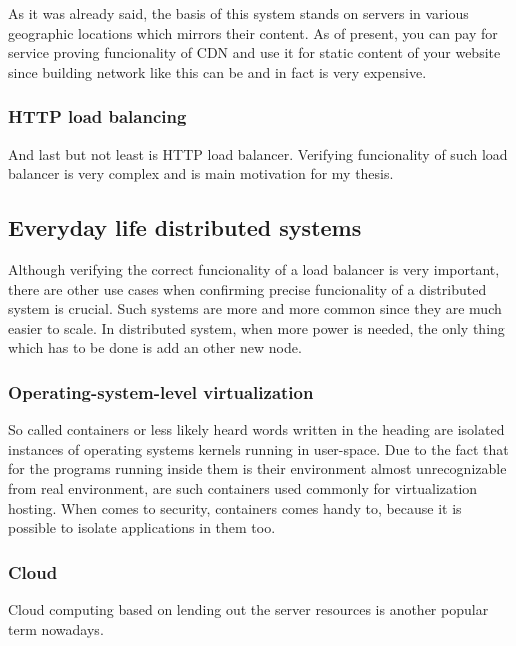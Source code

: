 \documentclass[
  master,
  biblatex,
  glossaries,
  index
]{kidiplom}
\begin{document}
As it was already said, the basis of this system stands on servers in various geographic locations which mirrors their content. As of present, you can pay for service proving funcionality of CDN and use it for static content of your website since building network like this can be and in fact is very expensive.

\subsubsection{HTTP load balancing}

And last but not least is HTTP load balancer. Verifying funcionality of such load balancer is very complex and is main motivation for my thesis. %

\subsection{Everyday life distributed systems}

Although verifying the correct funcionality of a load balancer is very important, there are other use cases when confirming precise funcionality of a distributed system is crucial. Such systems are more and more common since they are much easier to scale. In distributed system, when more power is needed, the only thing which has to be done is add an other new node. %

\subsubsection{Operating-system-level virtualization}

So called containers or less likely heard words written in the heading are isolated instances of operating systems kernels running in user-space. Due to the fact that for the programs running inside them is their environment almost unrecognizable from real environment, are such containers used commonly for virtualization hosting. When comes to security, containers comes handy to, because it is possible to isolate applications in them too. %

\subsubsection{Cloud}

Cloud computing based on lending out the server resources is another popular term nowadays.
\end{document}
